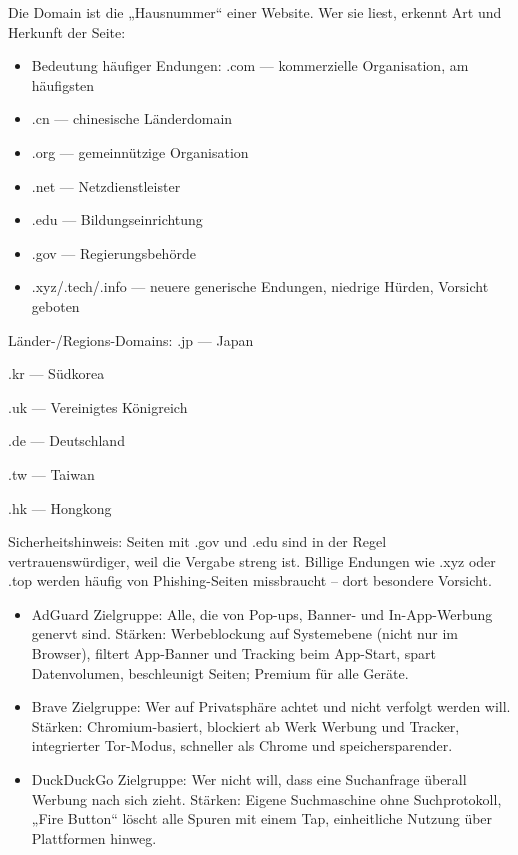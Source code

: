 
Die Domain ist die „Hausnummer“ einer Website. Wer sie liest, erkennt Art und Herkunft der Seite:

\begin{itemize}
  \item Bedeutung häufiger Endungen: .com — kommerzielle Organisation, am häufigsten
  \item .cn — chinesische Länderdomain
  \item .org — gemeinnützige Organisation
  \item .net — Netzdienstleister
  \item .edu — Bildungseinrichtung
  \item .gov — Regierungsbehörde
  \item .xyz/.tech/.info — neuere generische Endungen, niedrige Hürden, Vorsicht geboten
\end{itemize}

Länder-/Regions-Domains: .jp — Japan

.kr — Südkorea

.uk — Vereinigtes Königreich

.de — Deutschland

.tw — Taiwan

.hk — Hongkong

Sicherheitshinweis: Seiten mit .gov und .edu sind in der Regel vertrauenswürdiger, weil die Vergabe streng ist. Billige Endungen wie .xyz oder .top werden häufig von Phishing-Seiten missbraucht – dort besondere Vorsicht.


\begin{itemize}
  \item AdGuard Zielgruppe: Alle, die von Pop-ups, Banner- und In-App-Werbung genervt sind. Stärken: Werbeblockung auf Systemebene (nicht nur im Browser), filtert App-Banner und Tracking beim App-Start, spart Datenvolumen, beschleunigt Seiten; Premium für alle Geräte.
\end{itemize}


\begin{itemize}
  \item Brave Zielgruppe: Wer auf Privatsphäre achtet und nicht verfolgt werden will. Stärken: Chromium-basiert, blockiert ab Werk Werbung und Tracker, integrierter Tor-Modus, schneller als Chrome und speichersparender.
  \item DuckDuckGo Zielgruppe: Wer nicht will, dass eine Suchanfrage überall Werbung nach sich zieht. Stärken: Eigene Suchmaschine ohne Suchprotokoll, „Fire Button“ löscht alle Spuren mit einem Tap, einheitliche Nutzung über Plattformen hinweg.
\end{itemize}

